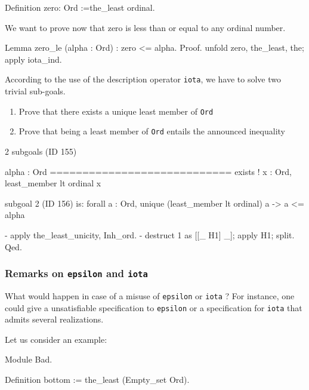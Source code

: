 \label{Constants:zero:Ord}

\begin{Coqsrc}
Definition zero: Ord :=the_least ordinal.
\end{Coqsrc}

We want to prove now that zero is less than or equal to any ordinal number.

\begin{Coqsrc}
Lemma zero_le (alpha : Ord) :  zero <= alpha.
Proof.
  unfold zero, the_least, the; apply iota_ind.
\end{Coqsrc}

According to the use of the description operator \texttt{iota}, we have to solve  two trivial sub-goals.
\begin{enumerate}
\item Prove that there exists a unique least member of \texttt{Ord}
\item Prove that being a least member of \texttt{Ord} entails the announced inequality 
\end{enumerate}


\begin{Coqanswer}
2 subgoals (ID 155)
  
  alpha : Ord
  ============================
  exists ! x : Ord, least_member lt ordinal x

subgoal 2 (ID 156) is:
 forall a : Ord, unique (least_member lt ordinal) a -> 
                a <= alpha
\end{Coqanswer}

\begin{Coqsrc}
  -  apply the_least_unicity, Inh_ord.
  -  destruct 1 as [[_ H1] _]; apply H1; split. 
Qed.
\end{Coqsrc}

\subsubsection{Remarks on \texttt{epsilon} and \texttt{iota}}

 What would happen in case of a misuse of \texttt{epsilon} or \texttt{iota} ?
For instance, one could give a unsatisfiable specification to \texttt{epsilon} or 
a specification for \texttt{iota} that admits several realizations.

Let us consider an example:

\begin{Coqbad}
Module Bad.

 Definition bottom := the_least (Empty_set Ord).
\end{Coqbad}

